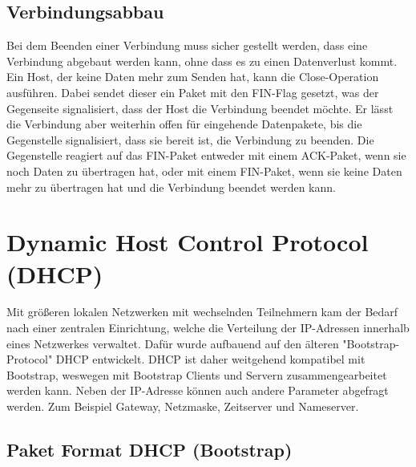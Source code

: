 \subsection{Verbindungsabbau}
Bei dem Beenden einer Verbindung muss sicher gestellt werden, dass eine Verbindung abgebaut werden kann, ohne dass es zu einen Datenverlust kommt. Ein Host, der keine Daten mehr zum Senden hat, kann die Close-Operation ausführen. Dabei sendet dieser ein Paket mit den FIN-Flag gesetzt, was der Gegenseite signalisiert, dass der Host die Verbindung beendet möchte. Er lässt die Verbindung aber weiterhin offen für eingehende Datenpakete, bis die Gegenstelle signalisiert, dass sie bereit ist, die Verbindung zu beenden. Die Gegenstelle reagiert auf das FIN-Paket entweder mit einem ACK-Paket, wenn sie noch Daten zu übertragen hat, oder mit einem FIN-Paket, wenn sie keine Daten mehr zu übertragen hat und die Verbindung beendet werden kann. 

\section{Dynamic Host Control Protocol (DHCP)}
Mit größeren lokalen Netzwerken mit wechselnden Teilnehmern kam der Bedarf nach einer zentralen Einrichtung, welche die Verteilung der IP-Adressen innerhalb eines Netzwerkes verwaltet. Dafür wurde aufbauend auf den älteren "{}Bootstrap-Protocol"{} DHCP entwickelt. DHCP ist daher weitgehend kompatibel mit Bootstrap, weswegen mit Bootstrap Clients und Servern zusammengearbeitet werden kann. 
Neben der IP-Adresse können auch andere Parameter abgefragt werden. Zum Beispiel Gateway, Netzmaske, Zeitserver und Nameserver. 



\subsection{Paket Format DHCP (Bootstrap)}

